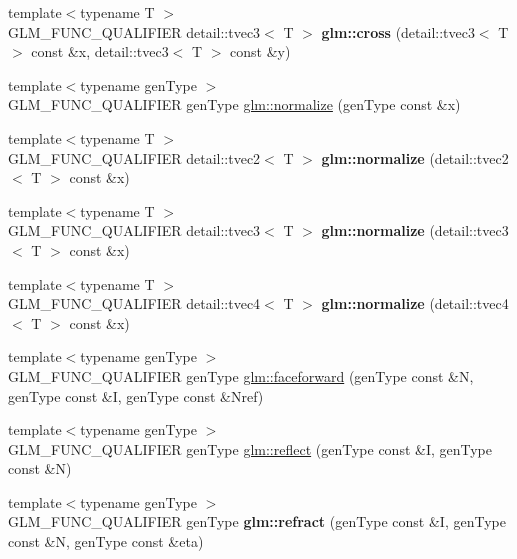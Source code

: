 \begin{DoxyCompactItemize}
\item 
\hypertarget{namespaceglm_a83f3f9d7e3603fbfa78a26e2063bfa02}{}{\footnotesize template$<$typename T $>$ }\\G\+L\+M\+\_\+\+F\+U\+N\+C\+\_\+\+Q\+U\+A\+L\+I\+F\+I\+E\+R detail\+::tvec3$<$ T $>$ {\bfseries glm\+::cross} (detail\+::tvec3$<$ T $>$ const \&x, detail\+::tvec3$<$ T $>$ const \&y)\label{namespaceglm_a83f3f9d7e3603fbfa78a26e2063bfa02}

\item 
{\footnotesize template$<$typename gen\+Type $>$ }\\G\+L\+M\+\_\+\+F\+U\+N\+C\+\_\+\+Q\+U\+A\+L\+I\+F\+I\+E\+R gen\+Type \hyperlink{group__core__func__geometric_ga15aa87101457e41663b08a8dcc3357f8}{glm\+::normalize} (gen\+Type const \&x)
\item 
\hypertarget{namespaceglm_a062d04793a570e36f1d76fb798b5d271}{}{\footnotesize template$<$typename T $>$ }\\G\+L\+M\+\_\+\+F\+U\+N\+C\+\_\+\+Q\+U\+A\+L\+I\+F\+I\+E\+R detail\+::tvec2$<$ T $>$ {\bfseries glm\+::normalize} (detail\+::tvec2$<$ T $>$ const \&x)\label{namespaceglm_a062d04793a570e36f1d76fb798b5d271}

\item 
\hypertarget{namespaceglm_a1f6e6247e73865728a13fa80190e394d}{}{\footnotesize template$<$typename T $>$ }\\G\+L\+M\+\_\+\+F\+U\+N\+C\+\_\+\+Q\+U\+A\+L\+I\+F\+I\+E\+R detail\+::tvec3$<$ T $>$ {\bfseries glm\+::normalize} (detail\+::tvec3$<$ T $>$ const \&x)\label{namespaceglm_a1f6e6247e73865728a13fa80190e394d}

\item 
\hypertarget{namespaceglm_abab14dd2c2e10451bd4fa85f2e291bfe}{}{\footnotesize template$<$typename T $>$ }\\G\+L\+M\+\_\+\+F\+U\+N\+C\+\_\+\+Q\+U\+A\+L\+I\+F\+I\+E\+R detail\+::tvec4$<$ T $>$ {\bfseries glm\+::normalize} (detail\+::tvec4$<$ T $>$ const \&x)\label{namespaceglm_abab14dd2c2e10451bd4fa85f2e291bfe}

\item 
{\footnotesize template$<$typename gen\+Type $>$ }\\G\+L\+M\+\_\+\+F\+U\+N\+C\+\_\+\+Q\+U\+A\+L\+I\+F\+I\+E\+R gen\+Type \hyperlink{group__core__func__geometric_ga4bbb036ef9527ee9f67384233029ed9b}{glm\+::faceforward} (gen\+Type const \&N, gen\+Type const \&I, gen\+Type const \&Nref)
\item 
{\footnotesize template$<$typename gen\+Type $>$ }\\G\+L\+M\+\_\+\+F\+U\+N\+C\+\_\+\+Q\+U\+A\+L\+I\+F\+I\+E\+R gen\+Type \hyperlink{group__core__func__geometric_gab63646fc36b81cf69d3ce123a72f76f2}{glm\+::reflect} (gen\+Type const \&I, gen\+Type const \&N)
\item 
\hypertarget{namespaceglm_a9aa448ae8257316d0bd2a7ba6e9f201d}{}{\footnotesize template$<$typename gen\+Type $>$ }\\G\+L\+M\+\_\+\+F\+U\+N\+C\+\_\+\+Q\+U\+A\+L\+I\+F\+I\+E\+R gen\+Type {\bfseries glm\+::refract} (gen\+Type const \&I, gen\+Type const \&N, gen\+Type const \&eta)\label{namespaceglm_a9aa448ae8257316d0bd2a7ba6e9f201d}


\end{DoxyCompactItemize}
